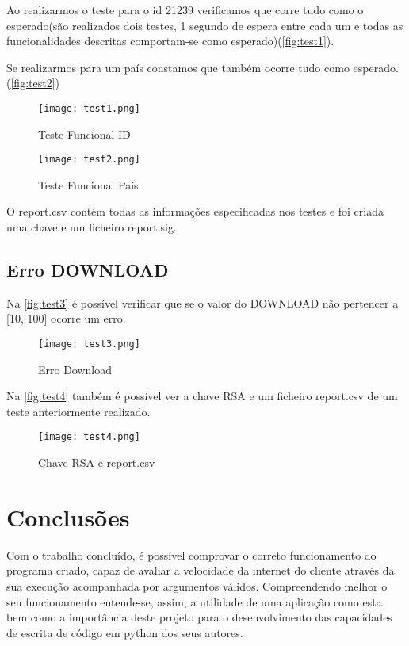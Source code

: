 \documentclass{report}
\begin{document}
 Ao realizarmos o teste para o id 21239 verificamos que corre tudo como o esperado(são realizados dois testes, 1 segundo de espera entre cada um e todas as funcionalidades descritas comportam-se como esperado)(\autoref{fig:test1}).
 
 Se realizarmos para um país constamos que também ocorre tudo como esperado.(\autoref{fig:test2})
 

 
\begin{figure}[h]
\center %
\texttt{[image: test1.png]}
\caption{Teste Funcional ID}
\label{fig:test1}
\end{figure}

\begin{figure}[h]
\center %
\texttt{[image: test2.png]}
\caption{Teste Funcional País}
\label{fig:test2}
\end{figure}

O report.csv contém todas as informações especificadas nos testes e foi criada uma chave e um ficheiro report.sig.



\section{Erro DOWNLOAD}
Na \autoref{fig:test3} é possível verificar que se o valor do DOWNLOAD não pertencer a [10, 100] ocorre um erro.

\begin{figure}[h]
\center %
\texttt{[image: test3.png]}
\caption{Erro Download}
\label{fig:test3}
\end{figure}


Na \autoref{fig:test4} também é possível ver a chave RSA e um ficheiro report.csv de um teste anteriormente realizado.

\begin{figure}[h]
\center %
\texttt{[image: test4.png]}
\caption{Chave RSA e report.csv}
\label{fig:test4}
\end{figure}


\chapter{Conclusões}
\label{chap.conclusao}
Com o trabalho concluído, é possível comprovar o correto funcionamento do programa criado, capaz de avaliar a velocidade da internet do cliente através da sua execução acompanhada por argumentos válidos. Compreendendo melhor o seu funcionamento entende-se, assim, a utilidade de uma aplicação como esta bem como a importância deste projeto para o desenvolvimento das capacidades de escrita de código em python dos seus autores.
\end{document}
